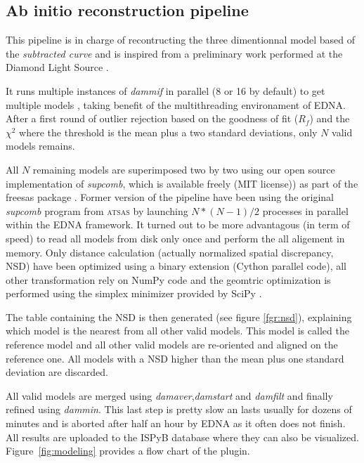 \documentclass[preprint,pdf]{iucr}              %
\begin{document}
\subsection{Ab initio reconstruction pipeline}
\label{abinitio}
This pipeline is in charge of recontructing the three dimentionnal model based
of the \textit{subtracted curve} and is inspired from a preliminary work
performed at the Diamond Light Source \cite{DiamondSE}.

It runs multiple instances of \textit{dammif} in parallel (8 or 16 by default)
to get multiple models \cite{dammif}, taking benefit of the multithreading
environament of EDNA.
After a first round of outlier rejection based on the goodness of fit ($R_{f}$)
and the $\chi^{2}$  where the threshold is the mean plus a two standard
deviations, only $N$ valid models remains.

All $N$ remaining models are superimposed two by two using
our open source implementation of \textit{supcomb}, which is available freely
(MIT license)) as part of the freesas package \cite{freesas}.  
Former version of the pipeline have been using the original 
\textit{supcomb} \cite{supcomb} program from \textsc{atsas} by launching
$N*(N-1)/2$ processes in parallel within the EDNA framework. 
It turned out to be
more advantagous (in term of speed) to read all models from disk only once and
perform the all aligement in memory. 
Only distance calculation (actually normalized spatial discrepancy, NSD) have
been optimized using a binary extension (Cython parallel code), all other
transformation rely on NumPy \cite{numpy} code and the geomtric optimization is
performed using the simplex minimizer provided by SciPy \cite{scipy}.

The table containing the NSD is then generated
(see figure \ref{fgr:nsd}), explaining which model is the nearest from all other
valid models. This model is called the reference model and all other valid
models are re-oriented and aligned on the reference one. 
All models with a NSD higher than the mean plus one standard deviation are
discarded.

All valid models are merged using \textit{damaver}\cite{damaver},\textit{damstart} and
\textit{damfilt} and finally refined using \textit{dammin}\cite{dammin}.
This last step is pretty slow an lasts usually for dozens of minutes and is
aborted after half an hour by EDNA as it often does not finish. 
All results are uploaded to the ISPyB database where they can also be
visualized. Figure~\ref{fig:modeling} provides a flow chart of the plugin.
\end{document}
